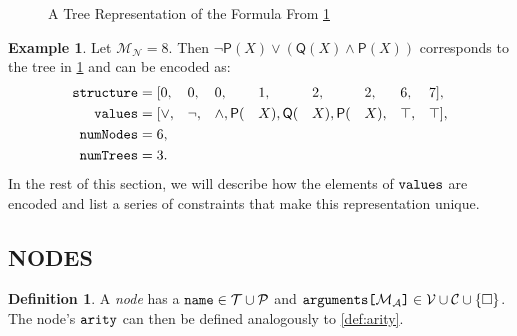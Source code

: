 \documentclass[letterpaper]{article}
\theoremstyle{definition}
\newtheorem{definition}{Definition}
\newtheorem{example}{Example}
\newcommand{\variable}[1]{\texttt{\textup{#1}}}
\newcommand{\arrayd}[3]{\variable{{#1}[}{#2}\variable{]} \in {#3}}
\newcommand{\predicates}{\mathcal{P}}
\newcommand{\variables}{\mathcal{V}}
\newcommand{\constants}{\mathcal{C}}
\newcommand{\tokens}{\mathcal{T}}
\newcommand{\maxArity}{\mathcal{M}_{\mathcal{A}}}
\newcommand{\maxNumNodes}{\mathcal{M}_{\mathcal{N}}}
\begin{document}
\begin{figure}
  \centering
  \caption{A Tree Representation of the Formula From \cref{example:formula}}
  \label{fig:example_tree}
\end{figure}

\begin{example} \label{example:formula}
  Let $\maxNumNodes{} = 8$. Then $\neg\mathsf{P}(X) \lor (\mathsf{Q}(X)
  \land \mathsf{P}(X))$ corresponds to the tree in \cref{fig:example_tree} and
  can be encoded as:
  \begin{alignat*}{8}
    \variable{structure} &= [0, &&0, &&0, &&1, &&2, &&2, &&6, &&7],\\
    \variable{values} &= [{\lor}, &&{\neg}, &&{\land}, \mathsf{P}(&&X), \mathsf{Q}(&&X), \mathsf{P}(&&X), &&\top, &&\top],\\
    \variable{numNodes} &= 6, && && && && && && &&\\
    \variable{numTrees} &= 3. && && && && && && &&
  \end{alignat*}
  In the rest of this section, we will describe how the elements of
  $\variable{values}$ are encoded and list a series of constraints that make
  this representation unique.
\end{example}

\subsection{NODES}

\begin{definition} \label{def:node}
  A \emph{node} has a $\variable{name} \in \tokens{} \cup \predicates{}$ and
  $\arrayd{arguments}{\maxArity{}}{\variables{} \cup \constants{} \cup \{ \Box
    \}}$. The node's $\variable{arity}$ can then be
  defined analogously to \cref{def:arity}.
\end{definition}
\end{document}
